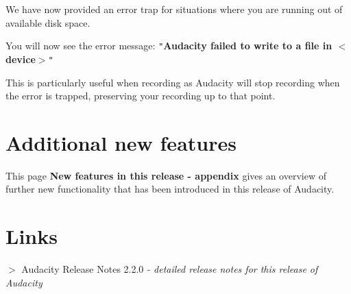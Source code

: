 We have now provided an error trap for situations where you are running out of available disk space.

You will now see the error message:
\texttt{{}"{}}\textbf{Audacity failed to write to a file in \mbox{$<$}device\mbox{$>$}}\texttt{{}"{}}

This is particularly useful when recording as Audacity will stop recording when the error is trapped, preserving your recording up to that point.




\section{
Additional new features
}


This page \textbf{New features in this release - appendix} gives an overview of further new functionality that has been introduced in this release of Audacity.


\section{
Links
}


\textbf{\mbox{$>$}} Audacity Release Notes 2.2.0 \textit{- detailed release notes for this release of Audacity}%
% 
%  
% 
%  


